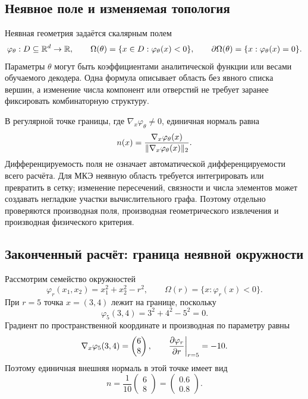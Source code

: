 \subsection{Неявное поле и изменяемая топология}
Неявная геометрия задаётся скалярным полем
\begin{equation}
 \varphi_{\theta}:D\subseteq\mathbb{R}^d\to\mathbb{R},
 \qquad
 \Omega(\theta)
 =
 \{x\in D:\varphi_{\theta}(x)<0\},
 \qquad
 \partial\Omega(\theta)
 =
 \{x:\varphi_{\theta}(x)=0\}.
\end{equation}
Параметры $\theta$ могут быть коэффициентами аналитической функции или весами обучаемого декодера. Одна формула описывает область без явного списка вершин, а изменение числа компонент или отверстий не требует заранее фиксировать комбинаторную структуру.

В регулярной точке границы, где $\nabla_x\varphi_{\theta}\neq0$, единичная нормаль равна
\begin{equation}
 n(x)
 =
 \frac{\nabla_x\varphi_{\theta}(x)}
      {\lVert\nabla_x\varphi_{\theta}(x)\rVert_2}.
\end{equation}
Дифференцируемость поля не означает автоматической дифференцируемости всего расчёта. Для МКЭ неявную область требуется интегрировать или превратить в сетку; изменение пересечений, связности и числа элементов может создавать негладкие участки вычислительного графа. Поэтому отдельно проверяются производная поля, производная геометрического извлечения и производная физического критерия.

\subsection{Законченный расчёт: граница неявной окружности}
\label{subsec:worked-implicit-circle}
Рассмотрим семейство окружностей
\begin{equation}
 \varphi_r(x_1,x_2)
 =
 x_1^2+x_2^2-r^2,
 \qquad
 \Omega(r)=\{x:\varphi_r(x)<0\}.
\end{equation}
При $r=5$ точка $x=(3,4)$ лежит на границе, поскольку
\begin{equation}
 \varphi_5(3,4)
 =
 3^2+4^2-5^2
 =0.
\end{equation}
Градиент по пространственной координате и производная по параметру равны
\begin{equation}
 \nabla_x\varphi_5(3,4)
 =
 \begin{pmatrix}6\\8\end{pmatrix},
 \qquad
 \frac{\partial \varphi_r}{\partial r}\bigg|_{r=5}
 =-10.
\end{equation}
Поэтому единичная внешняя нормаль в этой точке имеет вид
\begin{equation}
 n
 =
 \frac{1}{10}
 \begin{pmatrix}6\\8\end{pmatrix}
 =
 \begin{pmatrix}0.6\\0.8\end{pmatrix}.
\end{equation}

